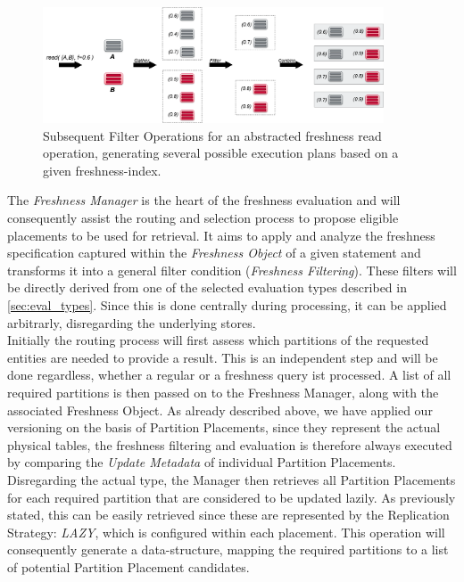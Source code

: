 \begin{figure}[t] 
    \centering 
    \includegraphics[width=0.9\textwidth]{Figures/filter.png}
    \caption{Subsequent Filter Operations for an abstracted freshness read operation, generating several possible execution plans based on a given freshness-index.}
    \label{fig:filter}
\end{figure}

The \emph{Freshness Manager} is the heart of the freshness evaluation and will consequently assist the routing and selection process to propose eligible placements
to be used for retrieval. 
It aims to apply and analyze the freshness specification captured within the \emph{Freshness Object} of a given statement and transforms it 
into a general filter condition (\emph{Freshness Filtering}). These filters will be directly derived from one of the selected evaluation types described in \ref{sec:eval_types}.
Since this is done centrally during processing, it can be applied arbitrarly, disregarding the underlying stores.\\
Initially the routing process will first assess which partitions of the requested entities are needed to provide a result.
This is an independent step and will be done regardless, whether a regular or a freshness query ist processed. 
A list of all required partitions is then passed on to the Freshness Manager, along with the associated Freshness Object. 
As already described above, we have applied our versioning on the basis of Partition Placements, since they represent the actual physical tables,
the freshness filtering and evaluation is therefore always executed by comparing the \emph{Update Metadata} of individual Partition Placements. 
Disregarding the actual type, the Manager then retrieves all Partition Placements for each required partition that are considered to be updated lazily.
As previously stated, this can be easily retrieved since these are represented by the Replication Strategy: \emph{LAZY}, which is configured within each placement. 
This operation will consequently generate a data-structure, mapping the required partitions to a list of potential Partition Placement candidates.

